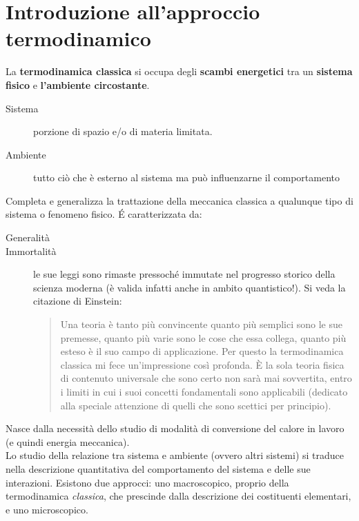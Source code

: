 \documentclass[10pt, oneside]{book}
\begin{document}
\tableofcontents
\newpage

\chapter{Introduzione all'approccio termodinamico}
La \textbf{termodinamica classica} si occupa degli \textbf{scambi energetici} tra un \textbf{sistema fisico} e \textbf{l'ambiente circostante}. 
\begin{description}
\item[Sistema] porzione di spazio e/o di materia limitata.
\item[Ambiente] tutto ciò che è esterno al sistema ma può influenzarne il comportamento
\end{description}
Completa e generalizza la trattazione della meccanica classica a qualunque tipo di sistema o fenomeno fisico. \'E caratterizzata da:
\begin{description}
\item[Generalità]
\item[Immortalità] le sue leggi sono rimaste pressoché immutate nel progresso storico della scienza moderna (è valida infatti anche in ambito quantistico!). Si veda la citazione di Einstein:
\begin{quote}
Una teoria è tanto più convincente quanto più semplici sono le sue premesse, quanto più varie sono le cose che essa collega, quanto più esteso è il suo campo di applicazione. Per questo la termodinamica classica mi fece un'impressione così profonda. È la sola teoria fisica di contenuto universale che sono certo non sarà mai sovvertita, entro i limiti in cui i suoi concetti fondamentali sono applicabili (dedicato alla speciale attenzione di quelli che 
sono scettici per principio).
\end{quote}
\end{description}
Nasce dalla necessità dello studio di modalità di conversione del calore in lavoro (e quindi energia meccanica).
\\Lo studio della relazione tra sistema e ambiente (ovvero altri sistemi) si traduce nella descrizione quantitativa del comportamento del sistema e delle sue interazioni. Esistono due approcci: uno macroscopico, proprio della termodinamica \textit{classica}, che prescinde dalla descrizione dei costituenti elementari, e uno microscopico.
\end{document}
